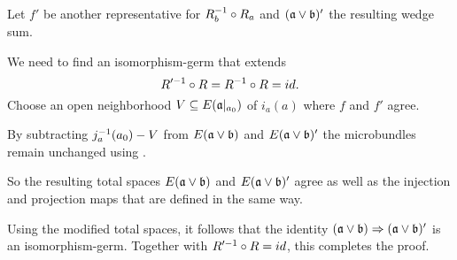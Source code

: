 \begin{myproof}
\begin{enumerate}
        Let $f'$ be another representative for $R_b^{-1} \circ R_a$ and $(\ba \vee \bb)'$ the resulting wedge sum.
        
        We need to find an isomorphism-germ that extends
        \[ R'^{-1} \circ R = R^{-1} \circ R = id. \]
        Choose an open neighborhood $V \subseteq{} E(\mathfrak{a}\vert_{a_0})$ of $i_a(a)$ where $f$ and $f'$ agree.
        
        By subtracting $j_a^{-1}(a_0) - V$ from $E(\ba \vee \bb)$ and $E(\ba \vee \bb)'$
        the microbundles remain unchanged using .
        
        So the resulting total spaces $E(\ba \vee \bb)$ and $E(\ba \vee \bb)'$ agree
        as well as the injection and projection maps that are defined in the same way.
        
        Using the modified total spaces,
        it follows that the identity $\germ{(\ba \vee \bb)}{(\ba \vee \bb)'}$
        is an isomorphism-germ.
        Together with $R'^{-1} \circ R = id$, this completes the proof.
    \end{enumerate}
\end{myproof}